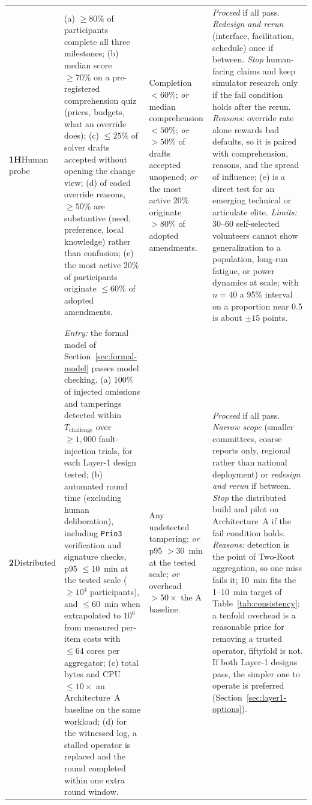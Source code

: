 \documentclass[10pt,twoside,openany]{book}
\theoremstyle{dpepstyle}
\begin{document}
{\begin{longtable}{L{0.45in} L{1.50in} L{1.10in} L{1.50in}}
\addlinespace[3pt]
\textbf{1H}\newline Human probe & (a) $\ge 80\%$ of participants complete all three milestones; (b) median score $\ge 70\%$ on a pre-registered comprehension quiz (prices, budgets, what an override does); (c) $\le 25\%$ of solver drafts accepted without opening the change view; (d) of coded override reasons, $\ge 50\%$ are substantive (need, preference, local knowledge) rather than confusion; (e) the most active 20\% of participants originate $\le 60\%$ of adopted amendments. & Completion $< 60\%$; \emph{or} median comprehension $< 50\%$; \emph{or} $> 50\%$ of drafts accepted unopened; \emph{or} the most active 20\% originate $> 80\%$ of adopted amendments. & \emph{Proceed} if all pass. \emph{Redesign and rerun} (interface, facilitation, schedule) once if between. \emph{Stop} human-facing claims and keep simulator research only if the fail condition holds after the rerun. \emph{Reasons:} override rate alone rewards bad defaults, so it is paired with comprehension, reasons, and the spread of influence; (e) is a direct test for an emerging technical or articulate elite. \emph{Limits:} 30--60 self-selected volunteers cannot show generalization to a population, long-run fatigue, or power dynamics at scale; with $n=40$ a 95\% interval on a proportion near 0.5 is about $\pm 15$ points. \\
\addlinespace[3pt]
\textbf{2}\newline Distri\-buted & \emph{Entry:} the formal model of Section~\ref{sec:formal-model} passes model checking. (a) 100\% of injected omissions and tamperings detected within $T_{\text{challenge}}$ over $\ge 1{,}000$ fault-injection trials, for each Layer-1 design tested; (b) automated round time (excluding human deliberation), including \texttt{Prio3} verification and signature checks, p95 $\le 10$~min at the tested scale ($\ge 10^4$ participants), and $\le 60$~min when extrapolated to $10^6$ from measured per-item costs with $\le 64$ cores per aggregator; (c) total bytes and CPU $\le 10\times$ an Architecture~A baseline on the same workload; (d) for the witnessed log, a stalled operator is replaced and the round completed within one extra round window. & Any undetected tampering; \emph{or} p95 $> 30$~min at the tested scale; \emph{or} overhead $> 50\times$ the A baseline. & \emph{Proceed} if all pass. \emph{Narrow scope} (smaller committees, coarse reports only, regional rather than national deployment) or \emph{redesign and rerun} if between. \emph{Stop} the distributed build and pilot on Architecture~A if the fail condition holds. \emph{Reasons:} detection is the point of Two-Root aggregation, so one miss fails it; 10~min fits the 1--10~min target of Table~\ref{tab:consistency}; a tenfold overhead is a reasonable price for removing a trusted operator, fiftyfold is not. If both Layer-1 designs pass, the simpler one to operate is preferred (Section~\ref{sec:layer1-options}). \\

\end{longtable}}
\end{document}
